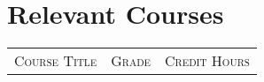 \documentclass[letterpaper]{article}
\begin{document}

\section{Relevant Courses}
\begin{center}
\begin{tabular}{lll}
\textsc{Course Title}	&	\textsc{Grade}	&	\textsc{Credit Hours}	\\

\end{tabular}
\end{center}

\end{document}
